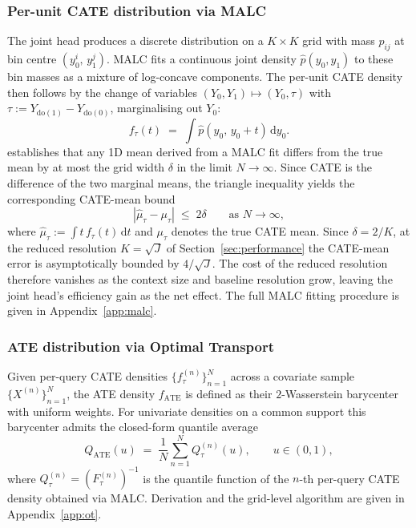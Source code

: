 \documentclass[11pt]{article}
\begin{document}
\subsubsection{Per-unit CATE distribution via MALC}
\label{sec:cate-malc}

The joint head produces a discrete distribution on a $K \times K$
grid with mass $p_{ij}$ at bin centre $(y_0^i,\, y_1^j)$. MALC fits
a continuous joint density $\hat p(y_0, y_1)$ to these bin masses
as a mixture of log-concave components. The per-unit CATE density
then follows by the change of variables
$(Y_0, Y_1) \mapsto (Y_0, \tau)$ with
$\tau := Y_{\mathrm{do}(1)} - Y_{\mathrm{do}(0)}$, marginalising
out $Y_0$:
\begin{equation}
    f_\tau(t) \;=\; \int \hat p(y_0,\, y_0 + t)\, \mathrm{d}y_0.
    \label{eq:cate-density}
\end{equation}
\citet{danisman2026malc} establishes that any 1D mean derived from a MALC fit differs from the true mean by at most the grid width $\delta$ in the limit $N \to \infty$. Since CATE is the difference of the two marginal means, the triangle inequality yields the corresponding CATE-mean bound
\[
    |\hat\mu_\tau - \mu_\tau| \;\leq\; 2\delta
    \qquad \text{as } N \to \infty,
\]
where $\hat\mu_\tau := \int t\, f_\tau(t)\, \mathrm{d}t$ and $\mu_\tau$ denotes
the true CATE mean. Since $\delta = 2/K$, at the reduced resolution
$K = \sqrt{J}$ of Section~\ref{sec:performance} the CATE-mean error is
asymptotically bounded by $4/\sqrt{J}$. The cost of the reduced resolution
therefore vanishes as the context size and baseline resolution grow, leaving the joint head's efficiency gain as the net effect. The full MALC fitting procedure is given in Appendix~\ref{app:malc}.
 
\subsubsection{ATE distribution via Optimal Transport}
\label{sec:ate-barycenter}

Given per-query CATE densities $\{f_\tau^{(n)}\}_{n=1}^{N}$ across
a covariate sample $\{X^{(n)}\}_{n=1}^{N}$, the ATE density
$f_{\mathrm{ATE}}$ is defined as their $2$-Wasserstein barycenter
with uniform weights. For univariate densities on a common support
this barycenter admits the closed-form quantile average
\begin{equation}
    Q_{\mathrm{ATE}}(u)
    \;=\; \frac{1}{N} \sum_{n=1}^{N} Q_\tau^{(n)}(u),
    \qquad u \in (0, 1),
    \label{eq:ate-quantile}
\end{equation}
where $Q_\tau^{(n)} = (F_\tau^{(n)})^{-1}$ is the quantile function
of the $n$-th per-query CATE density obtained via MALC. Derivation and the grid-level algorithm are given in Appendix~\ref{app:ot}.
\end{document}
